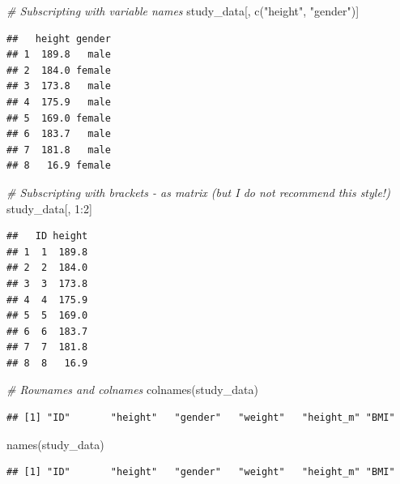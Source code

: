\documentclass[
]{book}
\newenvironment{Shaded}{\begin{snugshade}}{\end{snugshade}}
\newcommand{\CommentTok}[1]{\textcolor[rgb]{0.56,0.35,0.01}{\textit{#1}}}
\newcommand{\DecValTok}[1]{\textcolor[rgb]{0.00,0.00,0.81}{#1}}
\newcommand{\FunctionTok}[1]{\textcolor[rgb]{0.00,0.00,0.00}{#1}}
\newcommand{\NormalTok}[1]{#1}
\newcommand{\SpecialCharTok}[1]{\textcolor[rgb]{0.00,0.00,0.00}{#1}}
\newcommand{\StringTok}[1]{\textcolor[rgb]{0.31,0.60,0.02}{#1}}
\begin{document}
\begin{Shaded}
\begin{Highlighting}[]
\CommentTok{\# Subscripting with variable names}
\NormalTok{study\_data[, }\FunctionTok{c}\NormalTok{(}\StringTok{"height"}\NormalTok{, }\StringTok{"gender"}\NormalTok{)]}
\end{Highlighting}
\end{Shaded}

\begin{verbatim}
##   height gender
## 1  189.8   male
## 2  184.0 female
## 3  173.8   male
## 4  175.9   male
## 5  169.0 female
## 6  183.7   male
## 7  181.8   male
## 8   16.9 female
\end{verbatim}

\begin{Shaded}
\begin{Highlighting}[]
\CommentTok{\# Subscripting with brackets {-} as matrix (but I do not recommend this style!)}
\NormalTok{study\_data[, }\DecValTok{1}\SpecialCharTok{:}\DecValTok{2}\NormalTok{]}
\end{Highlighting}
\end{Shaded}

\begin{verbatim}
##   ID height
## 1  1  189.8
## 2  2  184.0
## 3  3  173.8
## 4  4  175.9
## 5  5  169.0
## 6  6  183.7
## 7  7  181.8
## 8  8   16.9
\end{verbatim}

\begin{Shaded}
\begin{Highlighting}[]
\CommentTok{\# Rownames and colnames}
\FunctionTok{colnames}\NormalTok{(study\_data)}
\end{Highlighting}
\end{Shaded}

\begin{verbatim}
## [1] "ID"       "height"   "gender"   "weight"   "height_m" "BMI"
\end{verbatim}

\begin{Shaded}
\begin{Highlighting}[]
\FunctionTok{names}\NormalTok{(study\_data)}
\end{Highlighting}
\end{Shaded}

\begin{verbatim}
## [1] "ID"       "height"   "gender"   "weight"   "height_m" "BMI"
\end{verbatim}
\end{document}
